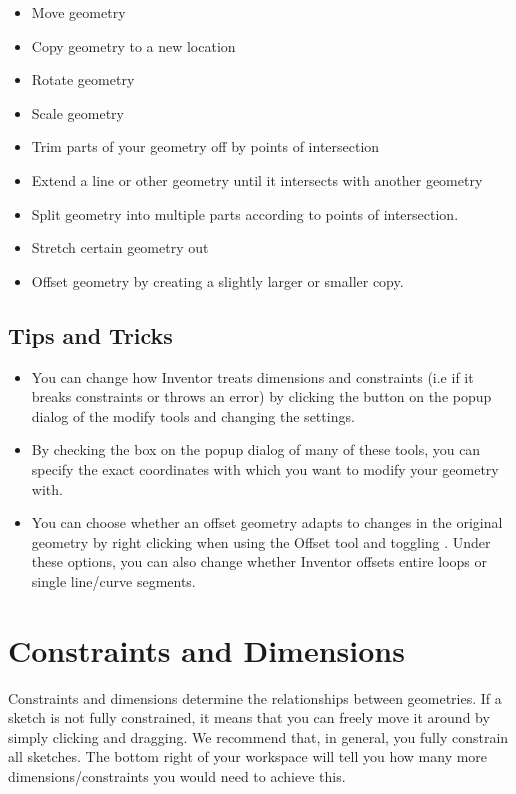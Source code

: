 \begin{itemize}
\item Move geometry
\item Copy geometry to a new location
\item Rotate geometry
\item Scale geometry
\item Trim parts of your geometry off by points of intersection
\item Extend a line or other geometry until it intersects with another geometry
\item Split geometry into multiple parts according to points of intersection.
\item Stretch certain geometry out
\item Offset geometry by creating a slightly larger or smaller copy.
\end{itemize}

\subsection{Tips and Tricks}
\begin{itemize}
\item You can change how Inventor treats dimensions and constraints (i.e if it breaks constraints or throws an error) by clicking the \appcommand{\textgreater \textgreater} button on the popup dialog of the modify tools and changing the settings.
\item By checking the  box on the popup dialog of many of these tools, you can specify the exact coordinates with which you want to modify your geometry with.
\item You can choose whether an offset geometry adapts to changes in the original geometry by right clicking when using the Offset tool and toggling . Under these options, you can also change whether Inventor offsets entire loops or single line/curve segments.
\end{itemize}

\section{Constraints and Dimensions}
\label{chap:constraints}
Constraints and dimensions determine the relationships between geometries. If a sketch is not fully constrained, it means that you can freely move it around by simply clicking and dragging. We recommend that, in general, you fully constrain all sketches. The bottom right of your workspace will tell you how many more dimensions/constraints you would need to achieve this.

